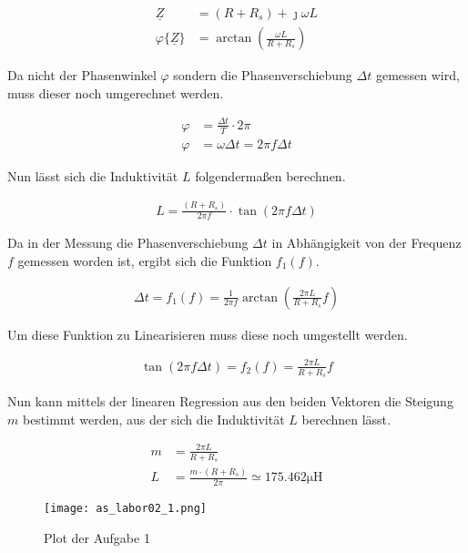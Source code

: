 \begin{equation} \label{eq214}
    \begin{split}
        \underline{Z} &= (R + R_s) + \jmath \omega L\\
        \varphi\{\underline{Z} \} &= \arctan \left( \frac{\omega L}{ R + R_s} \right)
    \end{split}
\end{equation}

Da nicht der Phasenwinkel $\varphi$ sondern die Phasenverschiebung $\Delta t$ gemessen
wird, muss dieser noch umgerechnet werden.

\begin{equation} \label{eq215}
    \begin{split}
        \varphi &= \frac{\Delta t}{T} \cdot 2 \pi \\
        \varphi &=  \omega \Delta t = 2 \pi f \Delta t
    \end{split}
\end{equation}

Nun lässt sich die Induktivität $L$ folgendermaßen berechnen.

\begin{equation} \label{eq216}
    \begin{split}
        L = \frac{(R+R_s) }{2 \pi f} \cdot \tan(2 \pi f \Delta t)
    \end{split}
\end{equation}

Da in der Messung die Phasenverschiebung $\Delta t$ in Abhängigkeit
von der Frequenz $f$ gemessen worden ist, ergibt sich die Funktion $f_1(f)$.

\begin{equation} \label{eq217}
    \begin{split}
       \Delta t = f_1(f) = \frac{1}{2 \pi f} \arctan \left( \frac{2 \pi L}{R + R_s} f \right)
    \end{split}
\end{equation}

Um diese Funktion zu Linearisieren muss diese noch umgestellt werden.

\begin{equation} \label{eq218}
    \begin{split}
       \tan(2 \pi f \Delta t) = f_2(f) = \frac{2 \pi L}{R + R_s} f
    \end{split}
\end{equation}

Nun kann mittels der linearen Regression aus den beiden Vektoren die Steigung
$m$ bestimmt werden, aus der sich die Induktivität $L$ berechnen lässt.

\begin{equation} \label{eq219}
    \begin{split}
       m &=  \frac{2 \pi L}{R + R_s}\\
       L &= \frac{m \cdot (R+R_s)}{2 \pi} \simeq 175.462 \mathrm{\mu H}
    \end{split}
\end{equation}


\begin{figure}[H]
 \centering
    \texttt{[image: as\_labor02\_1.png]}
 \caption{Plot der Aufgabe 1}
 \label{fig:PlotAufgabe1}
\end{figure}